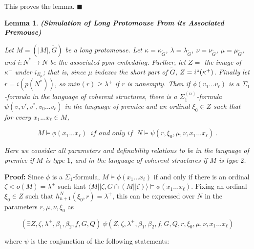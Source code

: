 \documentclass[12pt]{article}
\newtheorem{lem}[thm]{Lemma}
\begin{document}
 
 This proves the lemma. $\blacksquare$\\







\begin{lem} \label{long translation3}
\textbf{(Simulation of Long Protomouse From its Associated Premouse)}

Let $M = (|M| , \tilde{G})$ be a long protomouse.  Let $\kappa = \kappa_{\tilde{G}}$, $\lambda = \lambda_{\tilde{G}}$, $ \nu = \nu_{\tilde{G}}$, $\mu = \mu_{\tilde{G}}$, and $i: N^* \longrightarrow  N$ be the associated ppm embedding.  Further, let $Z =$ the image of $\kappa^+$ under $i_{E_\mu}$; that is, since $\mu$ indexes the short part of $\tilde{G}$, $Z = i``(\kappa^+ )$.  Finally let $r =  i (p (N^* ))$, so $min(r) \geq \lambda^+$ if $r$ is nonempty.  Then if $\phi ( v_1 ... v_\ell )$ is a $\Sigma_1$-formula in the language of coherent structures, there is a $\Sigma_1^{(n)}$-formula $\psi ( v, v' , v^*, v_0 ... v_\ell )$ in the language of premice and an ordinal $\xi_0 \in Z$ such that for every $x_1 ... x_\ell \in M$, 

\[
M \models \phi ( x_1 ... x_\ell ) \ \textit{ if and only if } \ N \models \psi ( r , \xi_0 , \mu , \nu , x_1 ... x_\ell ) \ .
\]


Here we consider all parameters and definability relations to be in the language of premice if $M$ is type $1$, and in the language of coherent structures if $M$ is type $2$.

\end{lem}

\indent \indent \textbf{Proof:}  Since $\phi$ is a $\Sigma_1$-formula, $M \models \phi (x_1 ... x_\ell)$ if and only if there is an ordinal $\zeta < o(M) = \lambda^+$ such that $ \langle M || \zeta , G \cap (M || \zeta) \rangle \models \phi (x_1 ... x_\ell )$.  Fixing an ordinal $\xi_0 \in Z$ such that $h_{n+1}^N ( \xi_0 , r ) = \lambda^+$, this can be expressed over $N$ in the parameters $r , \mu , \nu , \xi_0$ as

\[
( \exists Z , \zeta , \lambda^+ , \beta_1 , \beta_2 , f , G , Q ) \ \psi ( Z , \zeta , \lambda^+ , \beta_1 , \beta_2 , f , G , Q , r , \xi_0 , \mu , \nu , x_1 ... x_\ell )
\]

where $\psi$ is the conjunction of the following statements:\\
\end{document}
